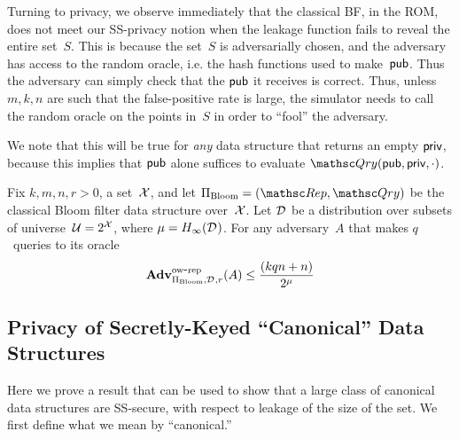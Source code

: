 Turning to privacy, we observe immediately that the classical BF, in the
ROM, does not meet our SS-privacy notion when the leakage function
fails to reveal the entire set~$S$.  This is because the set~$S$ is
adversarially chosen, and the adversary has access to the random
oracle, i.e. the hash functions used to make~${\sf pub}$.  Thus the
adversary can simply check that the ${\sf pub}$ it receives is correct.
Thus, unless $m,k,n$ are such that the false-positive rate is large,
the simulator needs to call the random oracle on the points in~$S$ in order to ``fool'' the adversary.

We note that this will be true for \emph{any} data structure that returns an empty ${\sf priv}$, because this implies that ${\sf pub}$ alone suffices to evaluate $\Qry(\pubaux,\privaux,\cdot)$.

\begin{theorem}\label{thm3}\label{thm:bf-ow}
Fix $k,m,n,r>0$, a set~${\cal X}$, and let $\setprim_{\mathrm{Bloom}}= (\Rep, \Qry)$ be the classical Bloom filter data structure over~${\cal X}$. Let $\mathcal{D}_{}^{}$ be a distribution over subsets of universe~${\cal U}=2^{\cal X}$, where $\mu = H_\infty(\mathcal{D}_{}^{})$.  For any adversary~$A$ that makes $q$~queries to its oracle
\[
\mathrm{\mathbf{Adv}}^{\mathrm{ow\mbox{-}rep}}_{\Pi_{\mathrm{Bloom}},\mathcal{D}_{}^{},r}(A) \leq  \frac{(kqn+n)}{2^{\mu}}
\]
\end{theorem}

\subsection{Privacy of Secretly-Keyed ``Canonical'' Data Structures}

Here we prove a result that can be used to show that a large class of canonical
data structures are SS-secure, with respect to leakage of the size of the set.
We first define what we mean by ``canonical.''

